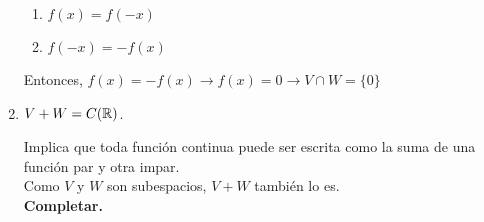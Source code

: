 \begin{enumerate}
\begin{mdframed}[style=s]
\begin{enumerate}
                    \item $f(x)=f(-x)$
                    \item $f(-x)=-f(x)$
                \end{enumerate}
                Entonces, $f(x)=-f(x)\to f(x)=0\to V\cap W=\{0\}$
            \end{mdframed}
        \item $V+W=C(\mathbb{R})$.
            \begin{mdframed}[style=s]
                Implica que toda función continua puede ser escrita como la suma de una función par y otra impar.\\
                Como $V$ y $W$ son subespacios, $V+W$ también lo es.\\
                \textbf{Completar.}
            \end{mdframed}
    \end{enumerate}